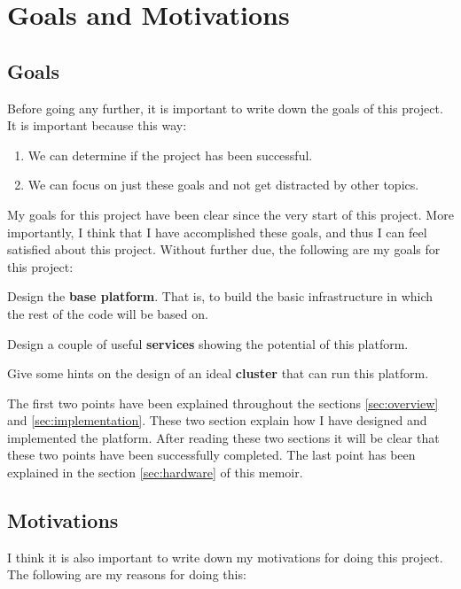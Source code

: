 
\section{Goals and Motivations}

\subsection{Goals}

Before going any further, it is important to write down the goals of this
project. It is important because this way:

\begin{enumerate}
  \itemsep0em
  \item We can determine if the project has been successful.
  \item We can focus on just these goals and not get distracted by other topics.
\end{enumerate}

My goals for this project have been clear since the very start of this project.
More importantly, I think that I have accomplished these goals, and thus I can
feel satisfied about this project. Without further due, the following are my
goals for this project:

\mylist
  \item Design the {\bf base platform}. That is, to build the basic
infrastructure in which the rest of the code will be based on.
  \item Design a couple of useful {\bf services} showing the potential of this
platform.
  \item Give some hints on the design of an ideal {\bf cluster} that can run
this platform.
\mylistend

The first two points have been explained throughout the sections
\ref{sec:overview} and \ref{sec:implementation}. These two section explain
how I have designed and implemented the platform. After reading these two
sections it will be clear that these two points have been successfully
completed. The last point has been explained in the section \ref{sec:hardware}
of this memoir.

\subsection{Motivations}

I think it is also important to write down my motivations for doing this
project. The following are my reasons for doing this:

